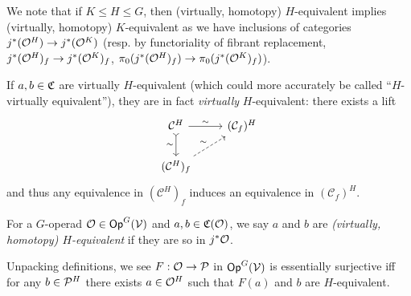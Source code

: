 \documentclass[a4paper,10pt
,draft
]{article}%
\renewcommand{\1}{\eta}%
\begin{document}
\begin{remark}
      \label{HK_EQUIV_REM}
      We note that if $K \leq H \leq G$, then (virtually, homotopy) $H$-equivalent implies (virtually, homotopy) $K$-equivalent
      as we have inclusions of categories
      $j^{\**}(\O^H) \to j^{\**}(\O^K)$
      (resp. by functoriality of fibrant replacement,
      $j^{\**}(\O^H)_f \to j^{\**}(\O^K)_f$,
      $\pi_0(j^{\**}(\O^H)_f) \to \pi_0(j^{\**}(\O^K)_f)$).
\end{remark}

\begin{remark}
      \label{HVIRT_REM}
      If $a,b\in \C$ are virtually $H$-equivalent (which could more accurately be called ``$H$-virtually equivalent''),
      they are in fact \textit{virtually} $H$-equivalent:
      there exists a lift
      \begin{equation}
            \label{FIBFIX_LIFT_EQ}
            \begin{tikzcd}
                  \mathcal C^H \arrow[d, tail, "\sim"'] \arrow[r, "\sim"]
                  &
                  (\mathcal C_f)^H
                  \\
                  (\mathcal C^H)_f \arrow[ur, dashed, "\sim"]
            \end{tikzcd}
      \end{equation}
      and thus any equivalence in $(\mathcal C^H)_f$ induces an equivalence in $(\mathcal C_f)^H$. 
\end{remark}

\begin{definition}
      For a $G$-operad $\O\in \mathsf{Op}^G(\V)$ and $a,b\in \C(\O)$, we say $a$ and $b$ are
      {\em (virtually, homotopy) $H$-equivalent}
      if they are so in $j^*\O$. 
\end{definition}

\begin{remark}
      \label{ESS_SUR_REM}
      Unpacking definitions, we see
      $F: \O \to \P$ in $\Op^G(\V)$ is essentially surjective iff
      for any $b \in \P^H$ there exists $a \in \O^H$ such that $F(a)$ and $b$ are $H$-equivalent.
\end{remark}
\end{document}
